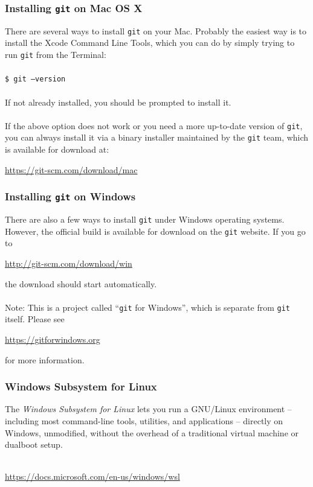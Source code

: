 \documentclass{beamer}
\begin{document}
\begin{frame}
   \frametitle{Installing \texttt{git} on Mac OS X}
   There are several ways to install \texttt{git} on your Mac. Probably 
   the easiest way is to install the Xcode Command Line Tools, which you 
   can do by simply trying to run \texttt{git} from the Terminal:
   \\ \ \\
   \hspace{1.0em}\texttt{\$ git --version}
   \\ \ \\
   If not already installed, you should be prompted to install it. 
   \\ \ \\
   If the above option does not work or you need a more up-to-date 
   version of \texttt{git}, you can always install it via a binary 
   installer maintained by the \texttt{git} team, which is available for
   download at: \\
   \begin{center}
      \url{https://git-scm.com/download/mac}
   \end{center}
\end{frame}

\begin{frame}
   \frametitle{Installing \texttt{git} on Windows}
   There are also a few ways to install \texttt{git} under Windows 
   operating systems. However, the official build is available for 
   download on the \texttt{git} website. If you go to \\
   \begin{center}
      \url{http://git-scm.com/download/win}
   \end{center}
   the download should start automatically.
   \\ \ \\
   Note: This is a project called ``\texttt{git} for Windows'', which is
   separate from \texttt{git} itself. Please see \\
   \begin{center}
      \url{https://gitforwindows.org}
   \end{center}
    for more information.
\end{frame}

\begin{frame}
   \frametitle{Windows Subsystem for Linux}
   The \textit{Windows Subsystem for Linux} lets you run a GNU/Linux
   environment -- including most command-line tools, utilities, and 
   applications -- directly on Windows, unmodified, without the overhead
   of a traditional virtual machine or dualboot setup. 
   \\ \ \\
   \begin{center}
      \url{https://docs.microsoft.com/en-us/windows/wsl}
   \end{center}
\end{frame}
\end{document}
